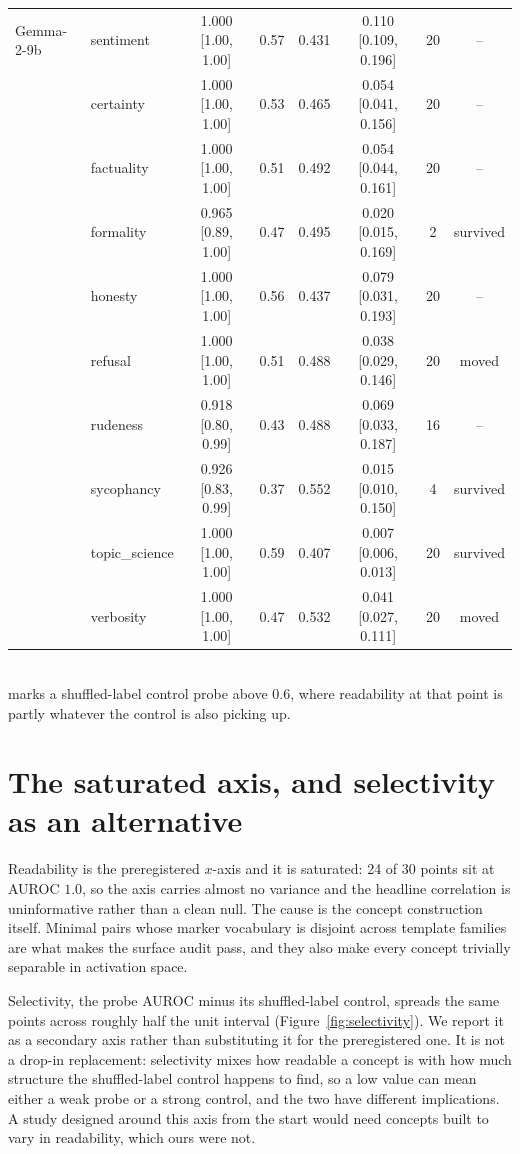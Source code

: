 \documentclass{article}
\begin{document}
\begin{table}[htbp]
\begin{tabular}{llcccccc}
    Gemma-2-9b & sentiment & 1.000 [1.00, 1.00] & 0.57 & 0.431 & 0.110 [0.109, 0.196] & 20 & -- \\
     & certainty & 1.000 [1.00, 1.00] & 0.53 & 0.465 & 0.054 [0.041, 0.156] & 20 & -- \\
     & factuality & 1.000 [1.00, 1.00] & 0.51 & 0.492 & 0.054 [0.044, 0.161] & 20 & -- \\
     & formality & 0.965 [0.89, 1.00] & 0.47 & 0.495 & 0.020 [0.015, 0.169] & 2 & survived \\
     & honesty & 1.000 [1.00, 1.00] & 0.56 & 0.437 & 0.079 [0.031, 0.193] & 20 & -- \\
     & refusal & 1.000 [1.00, 1.00] & 0.51 & 0.488 & 0.038 [0.029, 0.146] & 20 & moved \\
     & rudeness & 0.918 [0.80, 0.99] & 0.43 & 0.488 & 0.069 [0.033, 0.187] & 16 & -- \\
     & sycophancy & 0.926 [0.83, 0.99] & 0.37 & 0.552 & 0.015 [0.010, 0.150] & 4 & survived \\
     & topic\_science & 1.000 [1.00, 1.00] & 0.59 & 0.407 & 0.007 [0.006, 0.013] & 20 & survived \\
     & verbosity & 1.000 [1.00, 1.00] & 0.47 & 0.532 & 0.041 [0.027, 0.111] & 20 & moved \\
    \bottomrule
  \end{tabular}
  \\[2pt]
  \footnotesize * marks a shuffled-label control probe above $0.6$, where readability at that point is partly whatever the control is also picking up.
\end{table}

\section{The saturated axis, and selectivity as an alternative}
\label{app:selectivity}
\label{app:saturation}

Readability is the preregistered $x$-axis and it is saturated: 24 of 30 points
sit at AUROC $1.0$, so the axis carries almost no variance and the headline
correlation is uninformative rather than a clean null. The cause is the
concept construction itself. Minimal pairs whose marker vocabulary is disjoint
across template families are what makes the surface audit pass, and they also
make every concept trivially separable in activation space.

Selectivity, the probe AUROC minus its shuffled-label control, spreads the same
points across roughly half the unit interval (Figure~\ref{fig:selectivity}).
We report it as a secondary axis rather than substituting it for the
preregistered one. It is not a drop-in replacement: selectivity mixes how
readable a concept is with how much structure the shuffled-label control
happens to find, so a low value can mean either a weak probe or a strong
control, and the two have different implications. A study designed around this
axis from the start would need concepts built to vary in readability, which
ours were not.
\end{document}
